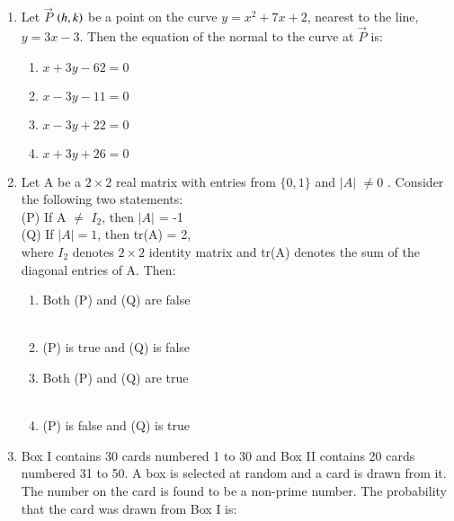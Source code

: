 \documentclass[journal]{IEEEtran}
\numberwithin{equation}{enumi}
\numberwithin{figure}{enumi}
\begin{document}
\begin{enumerate}
\begin{multicols}{4}
\begin{enumerate}
        \item $-\frac{1}{2}\brak{\sqrt{3} - i}$
        \item $\frac{1}{2}\brak{\sqrt{3} - i}$
    \end{enumerate} 
    \end{multicols}
    \item Let $\vec{P}$ $\left(h,k\right)$ be a point on the curve $y=x^2+7x+2$, nearest to the line, $y=3x-3$. Then the equation of the normal to the curve at $\vec{P}$ is: \\
    \begin{multicols}{4}
    \begin{enumerate}
        \item $x+3y-62=0$
        \item $x-3y-11=0$
        \item $x-3y+22=0$
        \item $x+3y+26=0$
    \end{enumerate} 
    \end{multicols}
    \item Let A be a $2\times2$ real matrix with entries from $\{0,1\}$ and $|A|$ $\neq $0 . Consider the following two statements: \\
    (P) If A $\neq$ $I_2$, then $|A|$ = -1 \\
    (Q) If $|A|=1$, then tr(A) = 2,\\where $I_2$ denotes $2\times2$ identity matrix and tr(A) denotes the sum of the diagonal entries of A. Then: \\
    \begin{multicols}{2}
    \begin{enumerate}
        \item Both (P) and (Q) are false\\\\
        \item (P) is true and (Q) is false
        \item Both (P) and (Q) are true\\\\
        \item (P) is false and (Q) is true
    \end{enumerate} 
    \end{multicols}
    \item Box I contains 30 cards numbered 1 to 30 and Box II contains 20 cards numbered 31 to 50. A box is selected at random and a card is drawn from it. The number on the card is found to be a non-prime number. The probability that the card was drawn from Box I is: \\

\end{enumerate}
\end{document}
